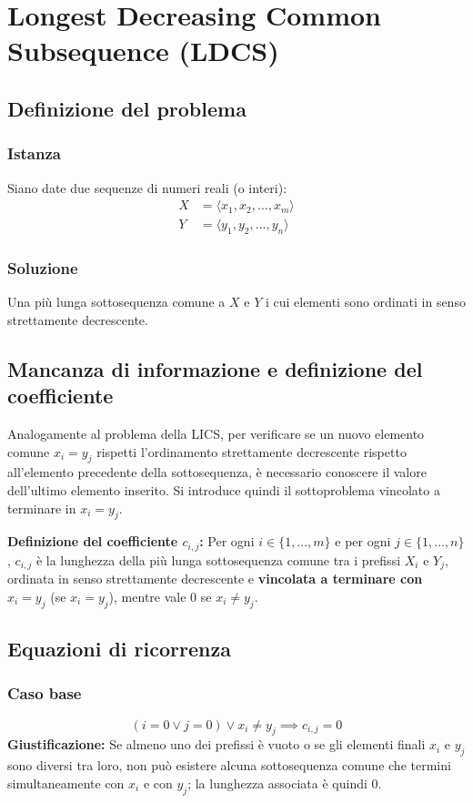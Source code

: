 \chapter{Longest Decreasing Common Subsequence (LDCS)}

\section{Definizione del problema}

\subsection{Istanza}
Siano date due sequenze di numeri reali (o interi):
\begin{align*}
    X &= \langle x_1, x_2, \dots, x_m \rangle \\
    Y &= \langle y_1, y_2, \dots, y_n \rangle
\end{align*}

\subsection{Soluzione}
Una più lunga sottosequenza comune a $X$ e $Y$ i cui elementi sono ordinati in senso strettamente decrescente.

\section{Mancanza di informazione e definizione del coefficiente}
Analogamente al problema della LICS, per verificare se un nuovo elemento comune $x_i = y_j$ rispetti l'ordinamento strettamente decrescente rispetto all'elemento precedente della sottosequenza, è necessario conoscere il valore dell'ultimo elemento inserito. Si introduce quindi il sottoproblema vincolato a terminare in $x_i = y_j$.

\medskip
\noindent
\textbf{Definizione del coefficiente $c_{i,j}$:} Per ogni $i \in \{1, \dots, m\}$ e per ogni $j \in \{1, \dots, n\}$, $c_{i,j}$ è la lunghezza della più lunga sottosequenza comune tra i prefissi $X_i$ e $Y_j$, ordinata in senso strettamente decrescente e \textbf{vincolata a terminare con $x_i = y_j$} (se $x_i = y_j$), mentre vale $0$ se $x_i \neq y_j$.

\section{Equazioni di ricorrenza}

\subsection{Caso base}
\[
    (i = 0 \lor j = 0) \lor x_i \neq y_j \implies c_{i,j} = 0
\]
\textbf{Giustificazione:} Se almeno uno dei prefissi è vuoto o se gli elementi finali $x_i$ e $y_j$ sono diversi tra loro, non può esistere alcuna sottosequenza comune che termini simultaneamente con $x_i$ e con $y_j$; la lunghezza associata è quindi $0$.

